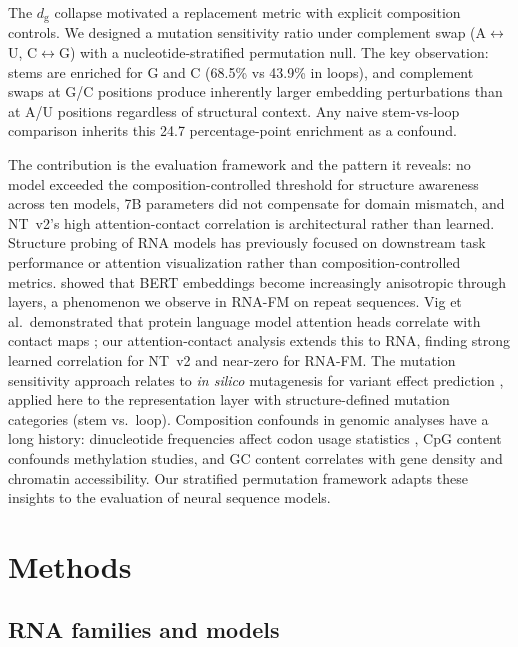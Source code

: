 \documentclass[11pt]{article}
\newcommand{\dg}{d_{\mathrm{g}}}
\begin{document}
The $\dg$ collapse motivated a replacement metric with explicit
composition controls.  We designed a mutation sensitivity ratio under
complement swap (A$\leftrightarrow$U, C$\leftrightarrow$G) with a
nucleotide-stratified permutation null.  The key observation: stems
are enriched for G and C (68.5\% vs 43.9\% in loops), and complement
swaps at G/C positions produce inherently larger embedding
perturbations than at A/U positions regardless of structural context.
Any naive stem-vs-loop comparison inherits this 24.7 percentage-point
enrichment as a confound.

The contribution is the evaluation framework and the pattern it
reveals: no model exceeded the composition-controlled threshold for
structure awareness across ten models, 7B parameters did not
compensate for domain mismatch, and NT~v2's high attention-contact
correlation is architectural rather than learned.  Structure probing of RNA models has previously focused on
downstream task performance \citep{rnafm,dalla2023nucleotide} or
attention visualization rather than composition-controlled metrics.
\citet{ethayarajh2019} showed that BERT embeddings become increasingly
anisotropic through layers, a phenomenon we observe in RNA-FM on
repeat sequences.  Vig et al.\ demonstrated that protein language
model attention heads correlate with contact maps
\citep{vig2020bertology}; our attention-contact analysis extends this
to RNA, finding strong learned correlation for NT~v2 and near-zero
for RNA-FM.  The mutation sensitivity approach relates to \emph{in
silico} mutagenesis for variant effect prediction
\citep{frazer2021disease}, applied here to the representation layer
with structure-defined mutation categories (stem vs.\ loop).
Composition confounds in genomic analyses have a long history:
dinucleotide frequencies affect codon usage statistics
\citep{karlin1998dinucleotide}, CpG content confounds methylation
studies, and GC content correlates with gene density and chromatin
accessibility.  Our stratified permutation framework adapts these
insights to the evaluation of neural sequence models.


\section{Methods}
\label{sec:methods}

\subsection{RNA families and models}
\label{sec:families_models}
\end{document}
